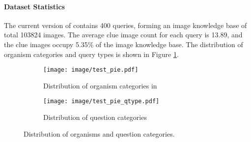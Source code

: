 
\vspace{-0.3em}
\paragraph{Dataset Statistics}
The current version of \ds contains 400 queries, forming an image knowledge base of total 103824 images. The average clue image count for each query is 13.89, and the clue images occupy 5.35\% of the image knowledge base. The distribution of organism categories and query types is shown in Figure \ref{fig:q_distribution}.

\begin{figure}[ht]
    \begin{subfigure}[]{\linewidth}
    \centering
        \texttt{[image: image/test\_pie.pdf]}
        \caption{Distribution of organism categories in \ds}
    \end{subfigure}
    \vspace{1em}
    \setlength{\belowcaptionskip}{-0.5cm}
    \begin{subfigure}[]{\linewidth}
    \centering
        \texttt{[image: image/test\_pie\_qtype.pdf]}
        \caption{Distribution of question categories}
    \end{subfigure}
    \setlength{\belowcaptionskip}{-0.2cm}
    \caption{Distribution of organisms and question categories.} %
    \label{fig:q_distribution}
\end{figure}